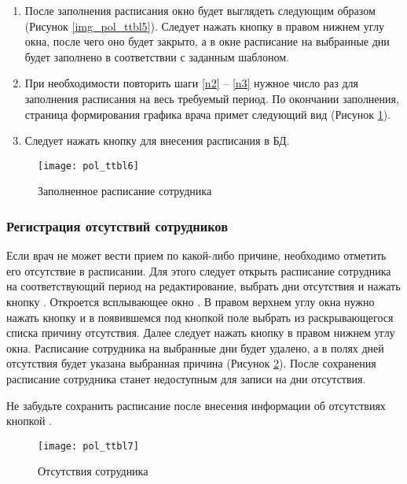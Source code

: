 \begin{enumerate}
 \item \label{n3} После заполнения расписания окно будет выглядеть следующим образом (Рисунок \ref{img_pol_ttbl5}). Следует нажать кнопку  в правом нижнем углу окна, после чего оно будет закрыто, а в окне  расписание на выбранные дни будет заполнено в соответствии с заданным шаблоном. 
 \item При необходимости повторить шаги \ref{n2} -- \ref{n3} нужное число раз для заполнения расписания на весь требуемый период. По окончании заполнения, страница формирования графика врача примет следующий вид (Рисунок \ref{img_pol_ttbl6}). 
 \item Следует нажать кнопку  для внесения расписания в БД. 
\end{enumerate}

\begin{figure}[ht]\centering
 \texttt{[image: pol\_ttbl6]}
 \caption{Заполненное расписание сотрудника}
 \label{img_pol_ttbl6}
\end{figure}

\subsubsection{Регистрация отсутствий сотрудников}

Если врач не может вести прием по какой-либо причине, необходимо отметить его отсутствие в расписании. Для этого следует открыть расписание сотрудника на соответствующий период на редактирование, выбрать дни отсутствия и нажать кнопку . Откроется всплывающее окно . В правом верхнем углу окна нужно нажать кнопку  и в появившемся под кнопкой поле выбрать из раскрывающегося списка причину отсутствия. Далее следует нажать кнопку  в правом нижнем углу окна. Расписание сотрудника на выбранные дни будет удалено, а в полях дней отсутствия будет указана выбранная причина (Рисунок \ref{img_pol_ttbl7}). После сохранения  расписание сотрудника станет недоступным для записи на дни отсутствия.

\begin{vnim}
 Не забудьте сохранить расписание после внесения информации об отсутствиях кнопкой .
\end{vnim} 

\begin{figure}[ht]\centering
 \texttt{[image: pol\_ttbl7]}
 \caption{Отсутствия сотрудника}
 \label{img_pol_ttbl7}
\end{figure}

